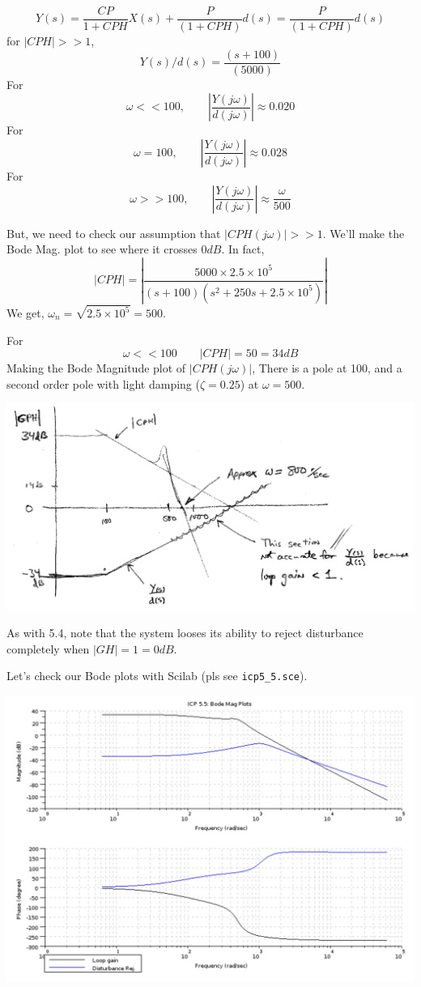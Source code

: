 \documentclass{article}	%
\begin{document}
\begin{solution}
\[
Y(s) = \frac{CP}{1+CPH}X(s) + \frac{P}{(1+CPH)}d(s) = \frac{P}{(1+CPH)}d(s)
\]
for $|CPH|>>1$,
\[
Y(s)/d(s) = \frac{(s+100)}{(5000)}
\]
For
\[
\omega << 100, \qquad \left | \frac {Y(j\omega)} {d(j\omega)} \right | \approx 0.020
\]
For
\[
\omega = 100, \qquad \left | \frac {Y(j\omega)} {d(j\omega)} \right | \approx 0.028
\]
For
\[
\omega >> 100, \qquad \left | \frac {Y(j\omega)} {d(j\omega)} \right | \approx \frac{\omega}{500}
\]

But, we need to check our assumption that $|CPH(j\omega)|>>1 $.  We'll make the Bode Mag. plot to see where it crosses $0dB$. In fact,
\[
|CPH| = |\frac{5000\times2.5\times10^5}{(s+100)(s^2+250s+2.5\times10^5)}|
\]
We get, $\omega_n = \sqrt{2.5\times10^5} = 500$.

For
\[
\omega << 100 \qquad |CPH| = 50 = 34dB
\]
Making the Bode Magnitude plot of $|CPH(j\omega)|$,  There is a pole at 100, and a second order pole with light damping ($\zeta=0.25$) at $\omega = 500$.

\includegraphics[width=7.0in]{00565a.png}


As with 5.4, note that the system looses its ability to reject disturbance completely when $|GH| = 1 = 0dB$.


Let's check our Bode plots with Scilab (pls see {\tt icp5\_5.sce}).

\includegraphics[width=7.0in]{icp5_5_bodea.png}


\end{solution}
\end{document}
